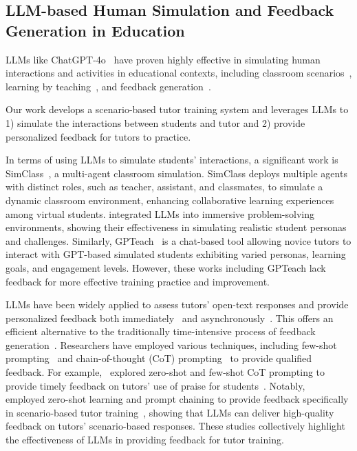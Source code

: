 \subsection{LLM-based Human Simulation and Feedback Generation in Education}
LLMs like ChatGPT-4o~\cite{openai2023chatgpt4} have proven highly effective in simulating human interactions and activities in educational contexts, including classroom scenarios~\cite{zhang2024simulating, thomas2023so, ma2024students}, learning by teaching~\cite{jin2024teach, schmucker2023ruffle}, and feedback generation~\cite{hirunyasiri2023comparative, lin2024can, dai2024assessing, stamper2024enhancing, demszky2024does}. 
 
Our work develops a scenario-based tutor training system and leverages LLMs to 1) simulate the interactions between students and tutor and 2) provide personalized feedback for tutors to practice.

In terms of using LLMs to simulate students' interactions, a significant work is SimClass~\cite{zhang2024simulating}, a multi-agent classroom simulation. SimClass deploys multiple agents with distinct roles, such as teacher, assistant, and classmates, to simulate a dynamic classroom environment, enhancing collaborative learning experiences among virtual students. \citet{lee23generative} integrated LLMs into immersive problem-solving environments, showing their effectiveness in simulating realistic student personas and challenges. Similarly, GPTeach~\cite{gpteach} is a chat-based tool allowing novice tutors to interact with GPT-based simulated students exhibiting varied personas, learning goals, and engagement levels. However, these works including GPTeach lack feedback for more effective training practice and improvement.

LLMs have been widely applied to assess tutors' open-text responses and provide personalized feedback both immediately~\cite{aleven2006toward} and asynchronously~\cite{dai2024assessing, stamper2024enhancing}. This offers an efficient alternative to the traditionally time-intensive process of feedback generation~\cite{dai2024assessing,stamper2024enhancing}. Researchers have employed various  techniques, including few-shot prompting~\cite{fewshot} and chain-of-thought (CoT) prompting~\cite{chain} to provide qualified feedback. For example,~\citet{hirunyasiri2023comparative} explored zero-shot and few-shot CoT prompting to provide timely feedback on tutors' use of praise for students~\cite{hirunyasiri2023comparative}. Notably,~\citet{learningandAI} employed zero-shot learning and prompt chaining to provide feedback specifically in scenario-based tutor training~\cite{learningandAI}, showing that LLMs can deliver high-quality feedback on tutors' scenario-based responses. These studies collectively highlight the effectiveness of LLMs in providing feedback for tutor training. 

